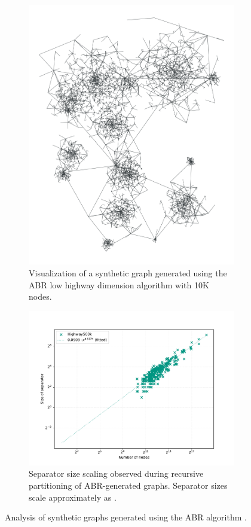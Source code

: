 \begin{figure}
	\centering
	\begin{subfigure}{0.35\linewidth}
		\centering
		\includegraphics[height=\linewidth, angle=90]{graphics/highway.png}
		\caption{Visualization of a synthetic graph generated using the ABR low highway dimension algorithm with 10K nodes.}
		\label{fig:abr_graph_viz}
	\end{subfigure}
	\hfill
	\begin{subfigure}{0.55\linewidth}
		\centering
		\includegraphics[width=\linewidth]{graphics/sep_highway.pdf}
		\caption{Separator size scaling observed during recursive partitioning of ABR-generated graphs. Separator sizes scale approximately as .}
		\label{fig:abr_graph_sep_plot}
	\end{subfigure}
	\caption{Analysis of synthetic graphs generated using the ABR algorithm \cite{abraham_highway_2010}.}
	\label{fig:abr_graph_separators}
\end{figure}
